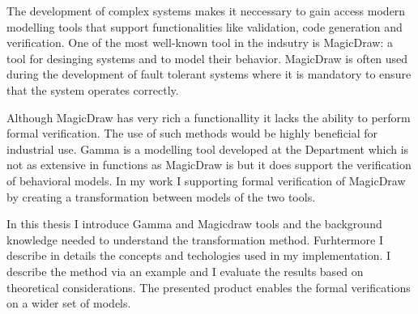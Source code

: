 The development of complex systems makes it neccessary to gain access  modern modelling tools that support functionalities like validation, code generation and verification. One of the most well-known tool in the indsutry is MagicDraw: a tool for desinging systems and to model their behavior. MagicDraw is often used during the development of fault tolerant systems where it is mandatory to ensure that the system operates correctly.

Although MagicDraw has very rich a functionallity it lacks the ability to perform formal verification. The use of such methods would be highly beneficial for industrial use. Gamma is a modelling tool developed at the Department which is not as extensive in functions as MagicDraw is but it does support the verification of behavioral models. In my work I supporting formal verification of MagicDraw by creating a transformation between models of the two tools.

In this thesis I introduce Gamma and Magicdraw tools and the background knowledge needed to understand the transformation method. Furhtermore I describe in details the concepts and techologies used in my implementation. I describe the method via an example and I evaluate the results based on theoretical considerations. The presented product enables the formal verifications on a wider set of models.


\vfill
\selectthesislanguage

\setcounter{romanPage}{\value{page}}
